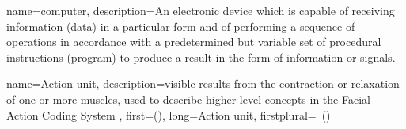  {
	name={computer}, 
	description={An electronic device which is capable of receiving information (data) in a particular form and of performing a sequence of operations in accordance with a predetermined but variable set of procedural instructions (program) to produce a result in the form of information or signals.
}
}

 {
	name={Action unit}, 
	description={visible results from the contraction or relaxation of one or more muscles, used to describe higher level concepts in the Facial Action Coding System
},
	first={}(),
	long={Action unit},
	firstplural={\glspluralsuffix\ (\glspluralsuffix )}
	
}
